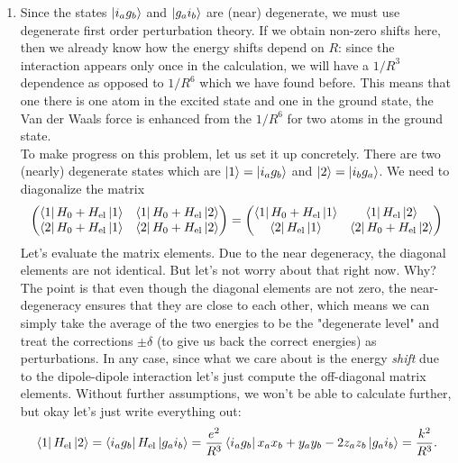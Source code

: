 \documentclass{article}
\theoremstyle{definition}
\newcommand{\f}[2]{\frac{#1}{#2}}
\begin{document}
\begin{enumerate}[label=(\alph*)]


\item Since the states $\ket{i_a g_b}$ and $\ket{g_a i_b}$ are (near) degenerate, we must use degenerate first order perturbation theory. If we obtain non-zero shifts here, then we already know how the energy shifts depend on $R$: since the interaction appears only once in the calculation, we will have a $\boxed{1/R^3}$ dependence as opposed to $1/R^6$ which we have found before. This means that one there is one atom in the excited state and one in the ground state, the Van der Waals force is enhanced from the $1/R^6$ for two atoms in the ground state. \\

To make progress on this problem, let us set it up concretely. There are two (nearly) degenerate states which are $\ket{1} = \ket{i_a g_b}$ and $\ket{2} = \ket{i_b g_a}$. We need to diagonalize the matrix
\begin{align*}
\begin{pmatrix}
\bra{1} H_0 + H_\text{el} \ket{1} & \bra{1} H_0 + H_\text{el} \ket{2} \\
\bra{2} H_0 + H_\text{el} \ket{1} & \bra{2} H_0 + H_\text{el} \ket{2}
\end{pmatrix} = 
\begin{pmatrix}
\bra{1} H_0 + H_\text{el} \ket{1} & \bra{1} H_\text{el} \ket{2} \\
\bra{2}  H_\text{el} \ket{1} & \bra{2} H_0 + H_\text{el} \ket{2}
\end{pmatrix} 
\end{align*}
Let's evaluate the matrix elements. Due to the near degeneracy, the diagonal elements are not identical. But let's not worry about that right now. Why? The point is that even though the diagonal elements are not zero, the near-degeneracy ensures that they are close to each other, which means we can simply take the average of the two energies to be the "degenerate level" and treat the corrections $\pm \delta$  (to give us back the correct energies) as perturbations. In any case, since what we care about is the energy \textit{shift} due to the dipole-dipole interaction let's just compute the off-diagonal matrix elements. Without further assumptions, we won't be able to calculate further, but okay let's just write everything out:
\begin{align*}
\bra{1} H_\text{el} \ket{2} = \bra{i_a g_b} H_\text{el} \ket{g_a i_b} = 
\f{e^2}{R^3} \bra{i_a g_b} x_a x_b + y_a y_b - 2z_a z_b \ket{g_a i_b} = \f{k^2}{R^3}.

\end{align*}
\end{enumerate}
\end{document}
